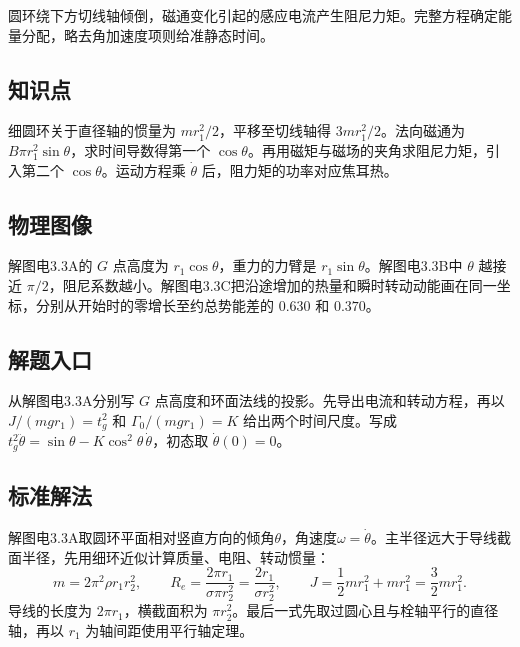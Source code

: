 \documentclass[UTF8,fontset=fandol,a4paper,11pt]{ctexart}
\begin{document}
圆环绕下方切线轴倾倒，磁通变化引起的感应电流产生阻尼力矩。完整方程确定能量分配，略去角加速度项则给准静态时间。



\subsection*{知识点}

细圆环关于直径轴的惯量为 $mr_1^2/2$，平移至切线轴得 $3mr_1^2/2$。法向磁通为 $B\pi r_1^2\sin\theta$，求时间导数得第一个 $\cos\theta$。再用磁矩与磁场的夹角求阻尼力矩，引入第二个 $\cos\theta$。运动方程乘 $\dot\theta$ 后，阻力矩的功率对应焦耳热。



\subsection*{物理图像}

解图电3.3A的 $G$ 点高度为 $r_1\cos\theta$，重力的力臂是 $r_1\sin\theta$。解图电3.3B中 $\theta$ 越接近 $\pi/2$，阻尼系数越小。解图电3.3C把沿途增加的热量和瞬时转动动能画在同一坐标，分别从开始时的零增长至约总势能差的 $0.630$ 和 $0.370$。



\subsection*{解题入口}

从解图电3.3A分别写 $G$ 点高度和环面法线的投影。先导出电流和转动方程，再以 $J/(mg r_1)=t_g^2$ 和 $\Gamma_0/(mg r_1)=K$ 给出两个时间尺度。写成 $t_g^2\ddot\theta=\sin\theta-K\cos^2\theta\,\dot\theta$，初态取 $\dot\theta(0)=0$。


\subsection*{标准解法}

解图电3.3A取圆环平面相对竖直方向的倾角$\theta$，角速度$\omega=\dot\theta$。主半径远大于导线截面半径，先用细环近似计算质量、电阻、转动惯量：
\[
m=2\pi^2\rho r_1r_2^2,\qquad
R_e=\frac{2\pi r_1}{\sigma\pi r_2^2}=\frac{2r_1}{\sigma r_2^2},\qquad
J=\frac12mr_1^2+mr_1^2=\frac32mr_1^2.
\]
导线的长度为 $2\pi r_1$，横截面积为 $\pi r_2^2$。最后一式先取过圆心且与栓轴平行的直径轴，再以 $r_1$ 为轴间距使用平行轴定理。
\end{document}
